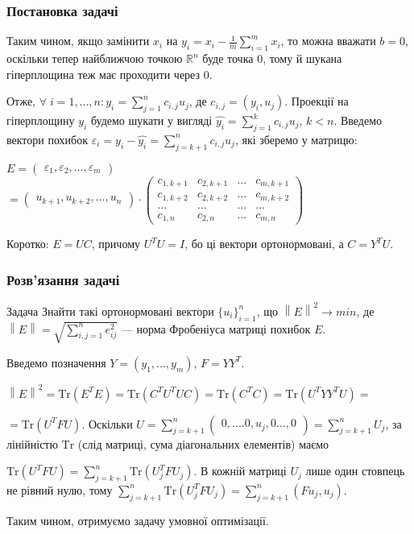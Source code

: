 \documentclass[10pt,pdf]{beamer}
\newcommand{\norm}[1]{\left\lVert#1\right\rVert} %
\newcommand{\dotprod}[2]{\left(#1, #2\right)} %
\newcommand{\Tr}[1]{\mathrm{Tr}\left(#1\right)}
\begin{document}
    \begin{frame}
        \frametitle{Постановка задачі}
        Таким чином, якщо замінити $x_i$ на $y_i = x_i - \frac{1}{m} \sum\limits_{i=1}^m x_i$,
        то можна вважати $b = 0$, оскільки тепер найближчою точкою $\mathbb{R}^n$ буде точка $0$,
        тому й шукана гіперплощина теж має проходити через $0$.

        Отже, $\forall \; i =1,...,n:{y_i} = \sum\limits_{j=1}^nc_{i, j}u_j$, де $c_{i, j} = \dotprod{y_i}{u_j}$.
        Проекції на гіперплощину ${y_i}$ будемо шукати у вигляді $\hat{y_i} = \sum\limits_{j=1}^kc_{i, j}u_j$, $k < n$.
        Введемо вектори похибок ${\varepsilon_i} = {y_i} - \hat{y_i} = \sum\limits_{j=k+1}^nc_{i, j}u_j$,
        які зберемо у матрицю:

        $E = 
        \begin{pmatrix}
            {\varepsilon_1}, {\varepsilon_2}, ..., {\varepsilon_m} 
        \end{pmatrix}$
        $
        =
        \begin{pmatrix}
            {u_{k+1}}, {u_{k+2}}, ..., {u_{n}}
        \end{pmatrix}
        \cdot
        \begin{pmatrix}
            c_{1, k+1} & c_{2, k+1} & ... & c_{m, k+1}\\
            c_{1, k+2} & c_{2, k+2} & ... & c_{m, k+2}\\
            ... & ... & ... & ... \\
            c_{1, n} & c_{2, n} & ... & c_{m, n}
        \end{pmatrix}$

        Коротко: $E = U C$, причому $U^T U = I$, бо ці вектори ортонормовані, а
        $C = Y^T U$.
    \end{frame}
    \begin{frame}
        \frametitle{Розв'язання задачі}
        \begin{block}{Задача}
            Знайти такі ортонормовані вектори $\{u_i\}_{i=1}^n$, що $\norm{E}^2 \rightarrow min$, 
           де $\norm{E} = \sqrt{\sum_{i, j = 1}^n e_{ij}^2}$ --- норма Фробеніуса матриці похибок $E$.
        \end{block}
        Введемо позначення $Y = ({y_1}, ..., {y_m})$, $F = Y Y^T$.

        $\norm{E}^2 = \Tr{E^TE} = \Tr{C^T U^T U C} = \Tr{C^T C} =
        \Tr{U^T Y Y^T U} =$ 
        
        $= \Tr{U^T F U}$.
        Оскільки $U = \sum\limits_{j=k+1}^n \begin{pmatrix}
            0, .... 0, u_{j}, 0 ..., 0
        \end{pmatrix} = \sum\limits_{j=k+1}^n U_j$, за лінійністю $\mathrm{Tr}$ 
        (слід матриці, сума діагональних елементів) маємо

        $\Tr{U^T F U} = \sum\limits_{j = k+1}^n \Tr{U_j^T F U_j}$.
        В кожній матриці $U_j$ лише один стовпець не рівний нулю, тому
        $\sum\limits_{j = k+1}^n \Tr{U_j^T F U_j} = \sum\limits_{j = k+1}^n \dotprod{F u_j}{u_j}$.
        
        Таким чином, отримуємо задачу умовної оптимізації.
    \end{frame}
\end{document}
